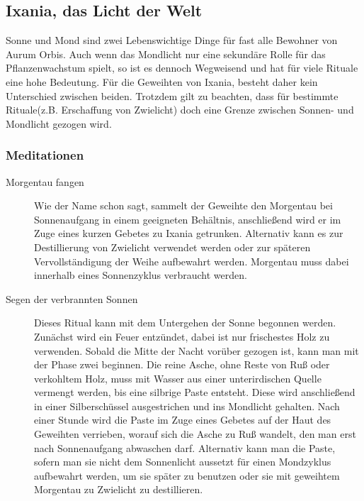 \documentclass[a4paper,12pt,oneside]{book}
\begin{document}
\subsection{Ixania, das Licht der Welt}\label{Ixania}
Sonne und Mond sind zwei Lebenswichtige Dinge für fast alle Bewohner von Aurum Orbis. Auch wenn das Mondlicht nur eine sekundäre Rolle für das Pflanzenwachstum spielt, so ist es dennoch Wegweisend und hat für viele Rituale eine hohe Bedeutung. Für die Geweihten von Ixania, besteht daher kein Unterschied zwischen beiden. Trotzdem gilt zu beachten, dass für bestimmte Rituale(z.B. Erschaffung von Zwielicht) doch eine Grenze zwischen Sonnen- und Mondlicht gezogen wird. 
 \subsubsection{Meditationen}
\begin{description}
\item[Morgentau fangen]
Wie der Name schon sagt, sammelt der Geweihte den Morgentau bei Sonnenaufgang in einem geeigneten Behältnis, anschließend wird er im Zuge eines kurzen Gebetes zu Ixania getrunken. Alternativ kann es zur Destillierung von Zwielicht verwendet werden oder zur späteren Vervollständigung der Weihe aufbewahrt werden. Morgentau muss dabei innerhalb eines Sonnenzyklus verbraucht werden.
\item[Segen der verbrannten Sonnen]
Dieses Ritual kann mit dem Untergehen der Sonne begonnen werden. Zunächst wird ein Feuer entzündet, dabei ist nur frischestes Holz zu verwenden. Sobald die Mitte der Nacht vorüber gezogen ist, kann man mit der Phase zwei beginnen. Die reine Asche, ohne Reste von Ruß oder verkohltem Holz, muss mit Wasser aus einer unterirdischen Quelle vermengt werden, bis eine silbrige Paste entsteht. Diese wird anschließend in einer Silberschüssel ausgestrichen und ins Mondlicht gehalten. Nach einer Stunde wird die Paste im Zuge eines Gebetes auf der Haut des Geweihten verrieben, worauf sich die Asche zu Ruß wandelt, den man erst nach Sonnenaufgang abwaschen darf. Alternativ kann man die Paste, sofern man sie nicht dem Sonnenlicht aussetzt für einen Mondzyklus aufbewahrt werden, um sie später zu benutzen oder sie mit geweihtem Morgentau zu Zwielicht zu destillieren.
\end{description}
\end{document}
